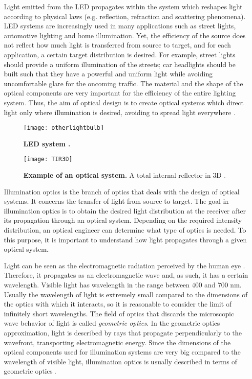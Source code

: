 Light emitted from the LED propagates within the system which reshapes light according to physical laws (e.g. reflection, refraction and scattering phenomena). LED systems are increasingly used in many applications such as street lights, automotive lighting and home illumination. Yet, the efficiency of the source does not reflect how much light is transferred from source to target, and for each application, a certain target distribution is desired. For example, street lights should provide a uniform illumination of the streets; car headlights should be built such that they have a powerful and uniform light while avoiding uncomfortable glare for the oncoming traffic. The material and the shape of the optical components are very important for the efficiency of the entire lighting system. Thus, the aim of optical design is to create optical systems which direct light only where illumination is desired, avoiding to spread light everywhere \cite{taguchi2008present, haitz2011solid}. 
\begin{figure}[t]
\centering
  \begin{minipage}[t]{0.42\textwidth}
    \texttt{[image: otherlightbulb]}
    \caption{\textbf{LED system \cite{Schweber}.}}
    \label{fig:led}
\end{minipage}\hfill
 \begin{minipage}[t]{0.42\textwidth}
    \texttt{[image: TIR3D]}
    \caption{\textbf{Example of an optical system.} A total internal reflector in $3$D \cite{prins2014inverse}.}
    \label{fig:tir_example_3D}
\end{minipage}
\end{figure}

Illumination optics is the branch of optics that deals with the design of optical systems. It concerns the transfer of light from source to target. The goal in illumination optics is to obtain the desired light distribution at the receiver after its propagation through an optical system. Depending on the required intensity distribution, an optical engineer can determine what type of optics is needed. To this purpose, it is important to understand how light propagates through a given optical system.

Light can be seen as the electromagnetic radiation perceived by the human eye \cite{schreuder2008outdoor}. Therefore, it propagates as an electromagnetic wave and, as such, it has a certain wavelength. Visible light has wavelength in the range between $400$ and $700$ nm. Usually the wavelength of light is extremely small compared to the dimensions of the optics with which it interacts, so it is reasonable to consider the limit of infinitely short wavelengths. The field of optics that discards the microscopic wave behavior of light is called \textit{geometric optics}. In the geometric optics approximation, light is described by rays that propagate perpendicularly to the wavefront, transporting electromagnetic energy. Since the dimensions of the optical components used for illumination systems are very big compared to the wavelength of visible light, illumination optics is usually described in terms of geometric optics \cite{born2013principles}. 


